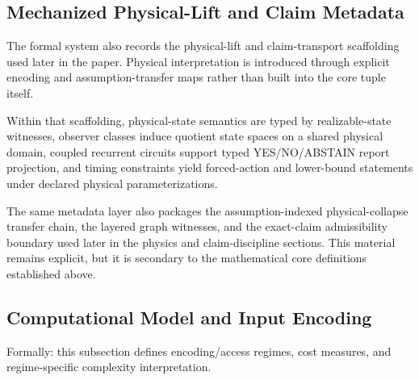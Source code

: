 \subsection{Mechanized Physical-Lift and Claim Metadata}\label{sec:foundations-mechanized-metadata}

The formal system also records the physical-lift and claim-transport scaffolding used later in the paper. Physical interpretation is introduced through explicit encoding and assumption-transfer maps rather than built into the core tuple itself.

Within that scaffolding, physical-state semantics are typed by realizable-state witnesses, observer classes induce quotient state spaces on a shared physical domain, coupled recurrent circuits support typed YES/NO/ABSTAIN report projection, and timing constraints yield forced-action and lower-bound statements under declared physical parameterizations.

The same metadata layer also packages the assumption-indexed physical-collapse transfer chain, the layered graph witnesses, and the exact-claim admissibility boundary used later in the physics and claim-discipline sections. This material remains explicit, but it is secondary to the mathematical core definitions established above.

\subsection{Computational Model and Input Encoding}\label{sec:encoding}

Formally: this subsection defines encoding/access regimes, cost measures, and regime-specific complexity interpretation.

